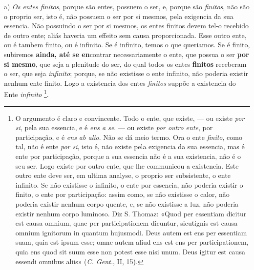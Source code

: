 a) \emph{Os entes finitos}, porque são entes, possuem o ser, e, porque são \emph{finitos}, não são o proprio ser, isto é, não possuem o ser por si mesmos, pela exigencia da sua essencia. Não possuindo o ser por si mesmos, os entes finitos devem tel-o recebido de outro ente; aliás haveria um effeito sem causa proporcionada. Esse outro ente, ou é tambem finito, ou é infinito. Se é infinito, temos o que queriamos. Se é finito, subiremos \textbf{ainda, até se en}contrar necessariamente o ente, que possua o ser \textbf{por si mesmo}, que seja a plenitude do ser, do qual todos os entes \textbf{finitos} receberam o ser, que seja \emph{infinito}; porque, se não existisse o ente infinito, não poderia existir nenhum ente finito. Logo a existencia dos entes \emph{finitos} suppõe a existencia do Ente \emph{infinito} \footnote{O argumento é claro e convincente. Todo o ente, que existe, --- ou existe \emph{por si}, pela sua essencia, e é \emph{ens a se}. --- ou existe \emph{por outro ente}, por participação, e é \emph{ens ab alio}. Não se dá meio termo. Ora o ente \emph{finito}, como tal, não é ente \emph{por si}, isto é, não existe pela exigencia da sua essencia, mas é ente por participação, porque a sua essencia não é a sua existencia, não é o seu ser. Logo existe por outro ente, que lhe communicou a existencia. Este outro ente deve ser, em ultima analyse, o proprio ser subsistente, o ente infinito. Se não existisse o infinito, o ente por essencia, não poderia existir o finito, o ente por participação: assim como, se não existisse o calor, não poderia existir nenhum corpo quente, e, se não existisse a luz, não poderia existir nenhum corpo luminoso. Diz S. Thomaz: «Quod per essentiam dicitur est causa omnium, quae per participationem dicuntur, sicutignis est causa omnium ignitorum in quantum hujusmodi. Deus autem est ens per essentiam suam, quia est ipsum esse; omne autem aliud ens est ens per participationem, quia ens quod sit suum esse non potest esse nisi unum. Deus igitur est causa essendi omnibus aliis» (\emph{C. Gent.}, II, 15).}.

